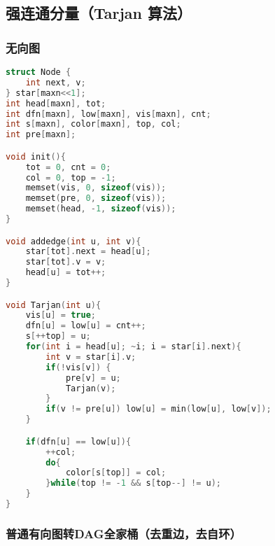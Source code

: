\subsection{强连通分量（Tarjan 算法）}

\subsubsection{无向图}

\begin{lstlisting}[language=C++]
struct Node {
    int next, v;
} star[maxn<<1];
int head[maxn], tot;
int dfn[maxn], low[maxn], vis[maxn], cnt;
int s[maxn], color[maxn], top, col;
int pre[maxn];

void init(){
    tot = 0, cnt = 0;
    col = 0, top = -1;
    memset(vis, 0, sizeof(vis));
    memset(pre, 0, sizeof(vis));
    memset(head, -1, sizeof(vis));
}

void addedge(int u, int v){
    star[tot].next = head[u];
    star[tot].v = v;
    head[u] = tot++;
}

void Tarjan(int u){
    vis[u] = true;
    dfn[u] = low[u] = cnt++;
    s[++top] = u;
    for(int i = head[u]; ~i; i = star[i].next){
        int v = star[i].v;
        if(!vis[v]) {
            pre[v] = u;
            Tarjan(v);
        }
        if(v != pre[u]) low[u] = min(low[u], low[v]);
    }

    if(dfn[u] == low[u]){
        ++col;
        do{
            color[s[top]] = col;
        }while(top != -1 && s[top--] != u);
    }
}
\end{lstlisting}

\subsubsection{普通有向图转DAG全家桶（去重边，去自环）}

